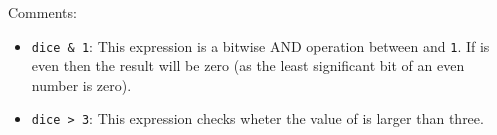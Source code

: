 \inputminted{csharp}{\context/answer/DiceTest.cs}

Comments:
\begin{itemize}
  \item \texttt{dice \& 1}: This expression is a bitwise AND operation between  and \texttt{1}. If  is even then the result will be zero (as the least significant bit of an even number is zero).
  \item \texttt{dice > 3}: This expression checks wheter the value of  is larger than three.
\end{itemize}

